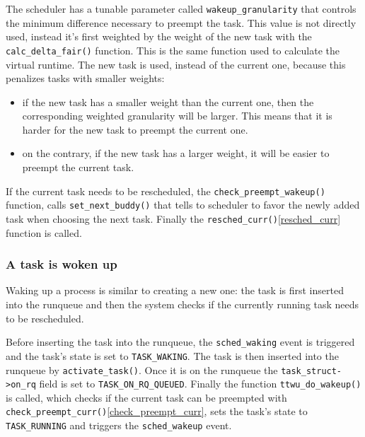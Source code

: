\documentclass[10pt]{book}
\begin{document}
The scheduler has a tunable parameter called \verb|wakeup_granularity| that controls the minimum difference necessary to preempt the task. This value is not directly used, instead it's first weighted by the weight of the new task with the \verb|calc_delta_fair()| function.  This is the same function used to calculate the virtual runtime. The new task is used, instead of the current one, because this penalizes tasks with smaller weights:
\begin{itemize}
    \item if the new task has a smaller weight than the current one, then the corresponding weighted granularity will be larger. This means that it is harder for the new task to preempt the current one.
    
    \item on the contrary, if the new task has a larger weight, it will be easier to preempt the current task. 
\end{itemize}

If the current task needs to be rescheduled, the \verb|check_preempt_wakeup()| function, calls \verb|set_next_buddy()| that tells to scheduler to favor the newly added task when choosing the next task. Finally the \verb|resched_curr()|\ref{resched_curr} function is called.

\subsubsection{A task is woken up}

Waking up a process is similar to creating a new one: the task is first inserted into the runqueue and then the system checks if the currently running task needs to be rescheduled.

Before inserting the task into the runqueue, the \verb|sched_waking|\label{trace:sched_waking} event is triggered and the task's state is set to \verb|TASK_WAKING|. The task is then inserted into the runqueue by \verb|activate_task()|. Once it is on the runqueue the \verb|task_struct->on_rq| field  is set to \verb|TASK_ON_RQ_QUEUED|. Finally the function \verb|ttwu_do_wakeup()| is called, which checks if the current task can be preempted with \verb|check_preempt_curr()|\ref{check_preempt_curr}, sets the task's state to \verb|TASK_RUNNING| and triggers the \verb|sched_wakeup|\label{trace:sched_wakeup} event.
\end{document}
